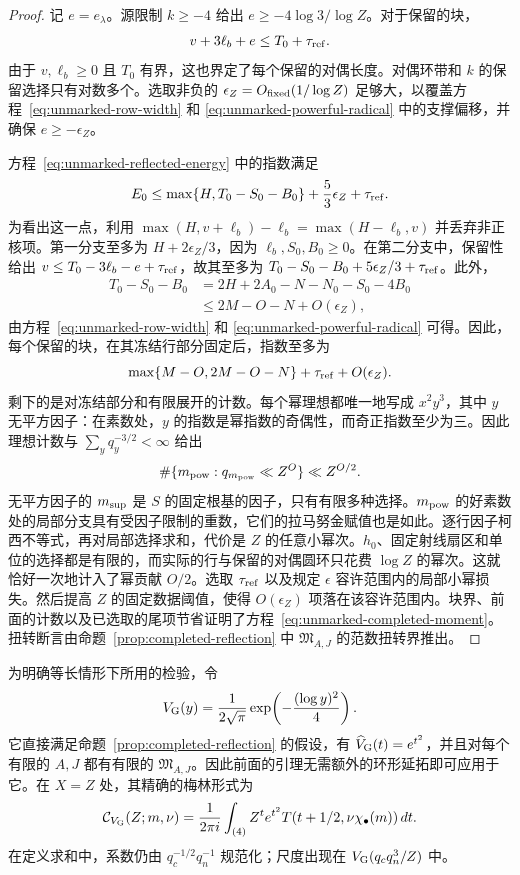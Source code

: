 \documentclass[11pt,a4paper]{article}
\numberwithin{equation}{section}
\numberwithin{figure}{section}
\theoremstyle{definition}
\theoremstyle{remark}
\begin{document}
\begin{proof}
记 $e=e_\lambda$。源限制 $k\ge-4$ 给出 $e\ge-4\log 3/\log Z$。对于保留的块，
\[
 v+3\ell_b+e\le T_0+\tau_{\rm ref}.
\]
由于 $v,\ell_b\ge0$ 且 $T_0$ 有界，这也界定了每个保留的对偶长度。对偶环带和 $k$ 的保留选择只有对数多个。选取非负的 $\epsilon_Z=O_{\rm fixed}(1/\log Z)$ 足够大，以覆盖方程~\eqref{eq:unmarked-row-width} 和 \eqref{eq:unmarked-powerful-radical} 中的支撑偏移，并确保 $e\ge-\epsilon_Z$。

方程~\eqref{eq:unmarked-reflected-energy} 中的指数满足
\[
 E_0\le\max\{H,T_0-S_0-B_0\}+\frac53\epsilon_Z+\tau_{\rm ref}.
\]
为看出这一点，利用 $\max(H,v+\ell_b)-\ell_b=\max(H-\ell_b,v)$ 并丢弃非正核项。第一分支至多为 $H+2\epsilon_Z/3$，因为 $\ell_b,S_0,B_0\ge0$。在第二分支中，保留性给出 $v\le T_0-3\ell_b-e+\tau_{\rm ref}$，故其至多为 $T_0-S_0-B_0+5\epsilon_Z/3+\tau_{\rm ref}$。此外，
\[
 \begin{split}
 T_0-S_0-B_0
 &=2H+2A_0-N-N_0-S_0-4B_0\\
 &\le 2M-O-N+O(\epsilon_Z),
 \end{split}
\]
由方程~\eqref{eq:unmarked-row-width} 和 \eqref{eq:unmarked-powerful-radical} 可得。因此，每个保留的块，在其冻结行部分固定后，指数至多为
\[
 \max\{M-O,2M-O-N\}+\tau_{\rm ref}+O(\epsilon_Z).
\]剩下的是对冻结部分和有限展开的计数。每个幂理想都唯一地写成 $x^2y^3$，其中 $y$ 无平方因子：在素数处，$y$ 的指数是幂指数的奇偶性，而奇正指数至少为三。因此理想计数与
$\sum_yq_y^{-3/2}<\infty$ 给出
\[
 \#\{m_{\rm pow}:q_{m_{\rm pow}}\ll Z^O\}\ll Z^{O/2}.
\]
无平方因子的 $m_{\rm sup}$ 是 $S$ 的固定根基的因子，只有有限多种选择。$m_{\rm pow}$ 的好素数处的局部分支具有受因子限制的重数，它们的拉马努金赋值也是如此。逐行因子柯西不等式，再对局部选择求和，代价是 $Z$ 的任意小幂次。$h_0$、固定射线扇区和单位的选择都是有限的，而实际的行与保留的对偶圆环只花费 $\log Z$ 的幂次。这就恰好一次地计入了幂贡献 $O/2$。选取 $\tau_{\rm ref}$ 以及规定 $\epsilon$ 容许范围内的局部小幂损失。然后提高 $Z$ 的固定数据阈值，使得 $O(\epsilon_Z)$ 项落在该容许范围内。块界、前面的计数以及已选取的尾项节省证明了方程~\eqref{eq:unmarked-completed-moment}。扭转断言由命题~\ref{prop:completed-reflection} 中 $\mathfrak M_{A,J}$ 的范数扭转界推出。
\end{proof}

为明确等长情形下所用的检验，令
\[
 V_{\rm G}(y)=\frac1{2\sqrt\pi}
           \exp\!\left(-\frac{(\log y)^2}{4}\right).
\]
它直接满足命题~\ref{prop:completed-reflection} 的假设，有 $\widehat V_{\rm G}(t)=e^{t^2}$，并且对每个有限的 $A,J$ 都有有限的 $\mathfrak M_{A,J}$。因此前面的引理无需额外的环形延拓即可应用于它。在 $X=Z$ 处，其精确的梅林形式为
\[
 \mathcal C_{V_{\rm G}}(Z;m,\nu)=\frac1{2\pi i}\int_{(4)}
       Z^t e^{t^2}T(t+1/2,\nu\chi_\bullet(m))\,dt.
\]
在定义求和中，系数仍由 $q_c^{-1/2}q_n^{-1}$ 规范化；尺度出现在 $V_{\rm G}(q_cq_n^3/Z)$ 中。
\end{document}
